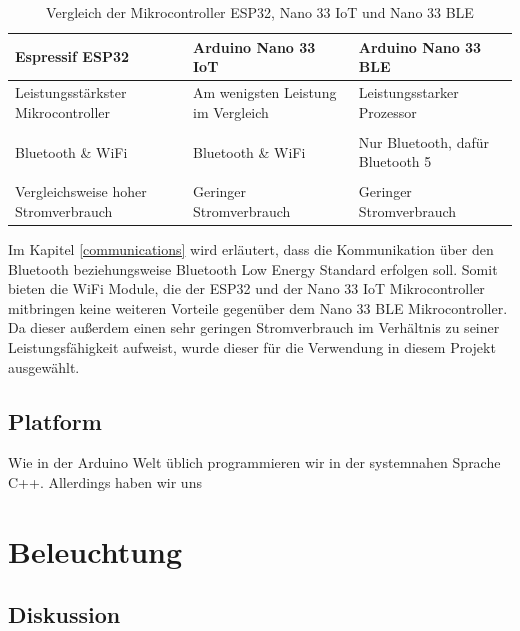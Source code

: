         \begin{table}[H]
            \caption{Vergleich der Mikrocontroller ESP32, Nano 33 IoT und Nano 33 BLE}
            \centering
            \begin{tabularx}{\textwidth}{  X | X | X  }
                \textbf{Espressif ESP32} & \textbf{Arduino Nano 33 IoT} & \textbf{Arduino Nano 33 BLE}\\ [0.5ex] \hline\hline
                Leistungsstärkster Mikrocontroller &
                Am wenigsten Leistung im Vergleich &
                Leistungsstarker Prozessor\\
                &&\\
                Bluetooth \& WiFi &
                Bluetooth \& WiFi &
                Nur Bluetooth, dafür Bluetooth 5 \\
                &&\\
                Vergleichsweise hoher Stromverbrauch &
                Geringer Stromverbrauch &
                Geringer Stromverbrauch \\
            \end{tabularx}
            \label{tab:compare_mics}
        \end{table}

        Im Kapitel \ref{communications} wird erläutert, dass die Kommunikation über den Bluetooth beziehungsweise Bluetooth Low Energy Standard erfolgen soll. Somit bieten die WiFi Module, die der ESP32 und der Nano 33 IoT Mikrocontroller mitbringen keine weiteren Vorteile gegenüber dem Nano 33 BLE Mikrocontroller. Da dieser außerdem einen sehr geringen Stromverbrauch im Verhältnis zu seiner Leistungsfähigkeit aufweist, wurde dieser für die Verwendung in diesem Projekt ausgewählt.


    \subsection{Platform}

        Wie in der Arduino Welt üblich programmieren wir in der systemnahen Sprache C++.
        Allerdings haben wir uns


\section{Beleuchtung}
    \subsection{Diskussion}

